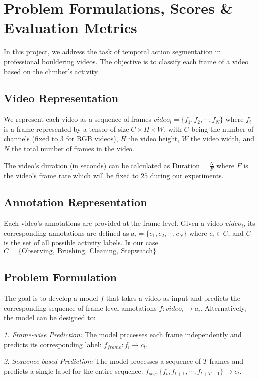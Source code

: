 \section{Problem Formulations, Scores \& Evaluation Metrics}

In this project, we address the task of temporal action segmentation in professional bouldering videos. The objective is to classify each frame of a video based on the climber's activity.

\subsection{Video Representation}
We represent each video as a sequence of frames $video_i = \{f_1, f_2, \cdots, f_N\}$ where $f_i$ is a frame represented by a tensor of size $C \times H \times W$, with $C$ being the number of channels (fixed to 3 for RGB videos), $H$ the video height, $W$ the video width, and $N$ the total number of frames in the video.

The video's duration (in seconds) can be calculated as $\text{Duration} = \frac{N}{F}$ where $F$ is the video's frame rate which will be fixed to $25$ during our experiments.

\subsection{Annotation Representation}
Each video's annotations are provided at the frame level. Given a video $video_i$, its corresponding annotations are defined as $a_i = \{c_1, c_2, \cdots, c_N\}$ where $c_i \in C$, and $C$ is the set of all possible activity labels. In our case $C = \{\text{Observing}, \: \text{Brushing}, \: \text{Cleaning}, \: \text{Stopwatch} \}$

\subsection{Problem Formulation}
The goal is to develop a model $f$ that takes a video as input and predicts the corresponding sequence of frame-level annotations $f : video_i \rightarrow a_i$. Alternatively, the model can be designed to:

\quad \emph{1. Frame-wise Prediction:} The model processes each frame independently and predicts its corresponding label:  
    $f_{frame} : f_t \rightarrow c_t$.

\quad \emph{2. Sequence-based Prediction:} The model processes a sequence of $T$ frames and predicts a single label for the entire sequence:  
    $f_{seq} : \{f_{t}, f_{t+1}, \cdots, f_{t+T-1} \} \rightarrow c_t$.

